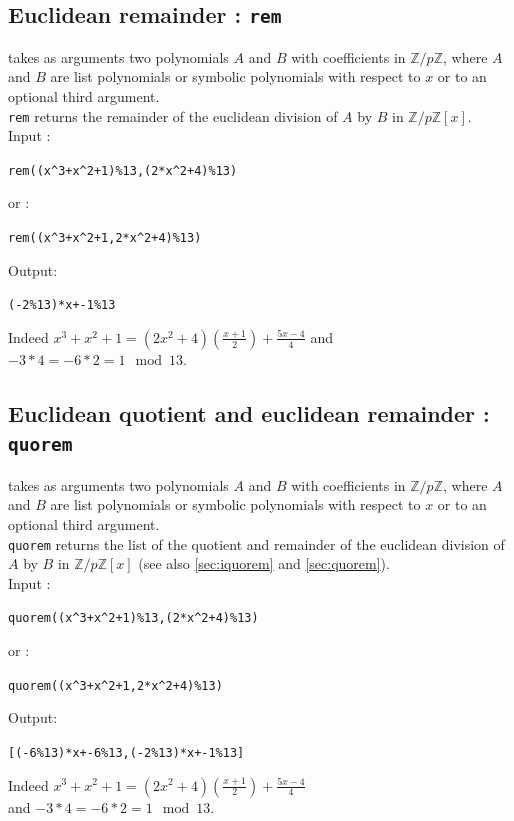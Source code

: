 \documentclass[a4paper,11pt]{book}
\newcommand{\Z}{{\mathbb{Z}}}
\begin{document}
\subsection{Euclidean remainder : {\tt rem}}
 takes as arguments  
two polynomials $A$ and $B$ with coefficients in $\Z/p\Z$, where
$A$ and $B$ are list polynomials or symbolic polynomials with
respect to $x$ or to an optional third argument.\\
{\tt rem} returns the remainder of the euclidean division  
of $A$ by $B$ in  $\Z/p\Z[x]$.\\
Input :
\begin{center}{\tt rem((x\verb|^|3+x\verb|^|2+1)\%13,(2*x\verb|^|2+4)\%13)}\end{center}
or :
\begin{center}{\tt rem((x\verb|^|3+x\verb|^|2+1,2*x\verb|^|2+4)\%13)}\end{center}
Output:
\begin{center}{\tt (-2\%13)*x+-1\%13}\end{center}
Indeed $\displaystyle x^3+x^2+1=(2x^2+4)(\frac{x+1}{2})+\frac{5x-4}{4}$
and $-3*4=-6*2=1 \ \bmod 13$.

\subsection{Euclidean quotient and euclidean remainder : {\tt quorem}}
 takes as arguments  
two polynomials $A$ and $B$ with coefficients in $\Z/p\Z$, where
$A$ and $B$ are list polynomials or symbolic polynomials with
respect to $x$ or to an optional third argument.\\
{\tt quorem} returns the list of the quotient and remainder of the 
euclidean division of $A$ by $B$ in $\Z/p\Z[x]$
(see also \ref{sec:iquorem} and  \ref{sec:quorem}).\\
Input :
\begin{center}{\tt quorem((x\verb|^|3+x\verb|^|2+1)\%13,(2*x\verb|^|2+4)\%13)}\end{center}
or :
\begin{center}{\tt quorem((x\verb|^|3+x\verb|^|2+1,2*x\verb|^|2+4)\%13)}\end{center}
Output:
\begin{center}{\tt [(-6\%13)*x+-6\%13,(-2\%13)*x+-1\%13]}\end{center}
Indeed
$\displaystyle x^3+x^2+1=(2x^2+4)(\frac{x+1}{2})+\frac{5x-4}{4}$\\
and $-3*4=-6*2=1 \ \bmod 13$.
\end{document}
